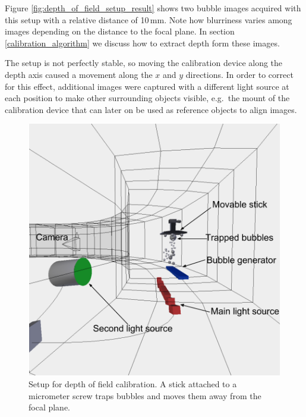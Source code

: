 			Figure \ref{fig:depth_of_field_setup_result} shows two bubble images acquired with this setup with a relative distance of 10\,mm. Note how blurriness varies among images depending on the distance to the focal plane. In section \ref{calibration_algorithm} we discuss how to extract depth form these images. 
			
			The setup is not perfectly stable, so moving the calibration device along the depth axis caused a movement along the $x$ and $y$ directions. In order to correct for this effect, additional images were captured with a different light source at each position to make other surrounding objects visible, e.g.\ the mount of the calibration device that can later on be used as reference objects to align images.  
			
			
			\begin{figure}
				\centering
				\includegraphics[scale=.5]{images/depth_of_field_setup.png}
				\caption{Setup for depth of field calibration. A stick attached to a micrometer screw traps bubbles and moves them away from the focal plane.}
				\label{fig:depth_of_field_setup}
			\end{figure}
			
